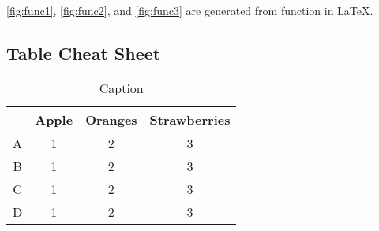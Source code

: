 \autoref{fig:func1}, \autoref{fig:func2}, and \autoref{fig:func3} are generated from function in \LaTeX. 


\subsection{Table Cheat Sheet}

\begin{table}[h]
    \centering
    \begin{tabular}{c|ccc}
        & Apple & Oranges & Strawberries \\
    \hline
    A & 1 & 2 & 3\\
    B & 1 & 2 & 3\\
    C & 1 & 2 & 3\\
    D & 1 & 2 & 3\\
    \end{tabular}
    \caption{Caption}
    \label{tab:my_label}
\end{table}
